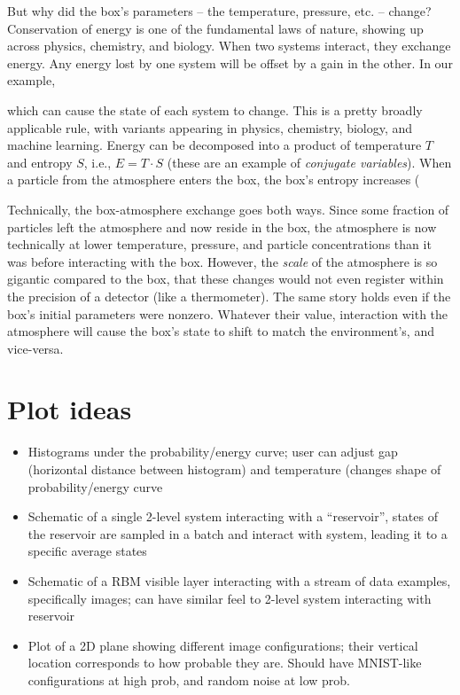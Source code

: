 \documentclass[nofootinbib, superscriptaddress, prl]{revtex4}
\begin{document}
But why did the box's parameters -- the temperature, pressure, etc. -- change? Conservation of energy is one of the fundamental laws of nature, showing up across physics, chemistry, and biology. When two systems interact, they exchange energy. Any energy lost by one system will be offset by a gain in the other. In our example, 


which can cause the state of each system to change. This is a pretty broadly applicable rule, with variants appearing in physics, chemistry, biology, and machine learning.
Energy can be decomposed into a product of temperature $T$ and entropy $S$, i.e., $E = T\cdot S$ (these are an example of \emph{conjugate variables}). When a particle from the atmosphere enters the box, the box's entropy increases (



Technically, the box-atmosphere exchange goes both ways. Since some fraction of particles left the atmosphere and now reside in the box, the atmosphere is now technically at lower temperature, pressure, and particle concentrations than it was before interacting with the box. However, the \emph{scale} of the atmosphere is so gigantic compared to the box, that these changes would not even register within the precision of a detector (like a thermometer). The same story holds even if the box's initial parameters were nonzero. Whatever their value, interaction with the atmosphere will cause the box's state to shift to match the environment's, and vice-versa. 



\section{Plot ideas}
\begin{itemize}
 \item Histograms under the probability/energy curve; user can adjust gap (horizontal distance between histogram) and temperature (changes shape of probability/energy curve
 \item Schematic of a single 2-level system interacting with a ``reservoir'', states of the reservoir are sampled in a batch and interact with system, leading it to a specific average states
 \item Schematic of a RBM visible layer interacting with a stream of data examples, specifically images; can have similar feel to 2-level system interacting with reservoir
 \item Plot of a 2D plane showing different image configurations; their vertical location corresponds to how probable they are. Should have MNIST-like configurations at high prob, and random noise at low prob.
\end{itemize}
\end{document}
